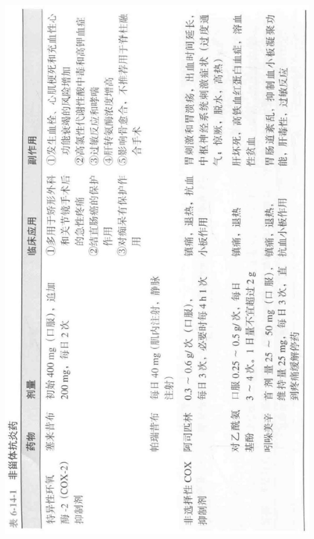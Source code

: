 \documentclass[10pt]{article}
\begin{document}
\begin{center}
\includegraphics[max width=\textwidth]{2024_07_05_645bb794a4d4f32ee0c8g-354}
\end{center}
\end{document}
